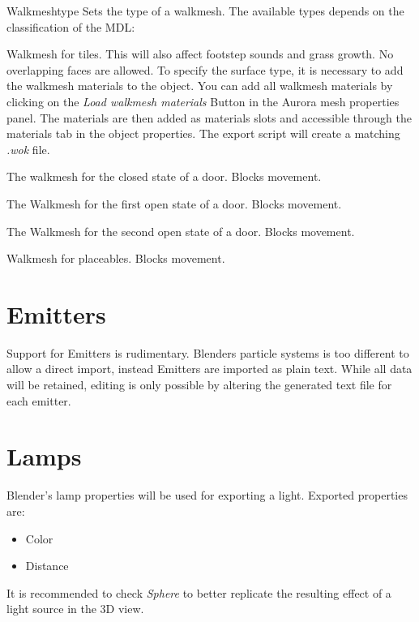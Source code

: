 \begin{propertyAurora}{Walkmeshtype} 
Sets the type of a walkmesh. The available types depends on the classification of the MDL:
\begin{description}[leftmargin=10em,style=nextline]
    \item[Tileset] Walkmesh for tiles. This will also affect footstep sounds and grass growth. No overlapping faces are allowed. To specify the surface type, it is necessary to add the walkmesh materials to the object. You can add all walkmesh materials by clicking on the {\textit{Load walkmesh materials}} Button in the Aurora mesh properties panel. The materials are then added as materials slots and accessible through the materials tab in the object properties.
    The export script will create a matching {\textit{.wok}} file. 
    \item[Door: Closed] The walkmesh for the closed state of a door. Blocks movement.
    \item[Door: Open 1] The Walkmesh for the first open state of a door. Blocks movement.
    \item[Door: Open 2] The Walkmesh for the second open state of a door. Blocks movement.
    \item[Placeable] Walkmesh for placeables. Blocks movement.
\end{description}
\end{propertyAurora}

\section{Emitters}
Support for Emitters is rudimentary. Blenders particle systems is too
different to allow a direct import, instead Emitters are imported as plain
text. While all data will be retained, editing is only possible by altering the 
generated text file for each emitter.

\section{Lamps}
Blender's lamp properties will be used for exporting a light.
Exported properties are:
\begin{itemize}
\item Color
\item Distance
\end{itemize}
It is recommended to check \textit{Sphere} to better replicate the resulting effect 
of a light source in the 3D view.

